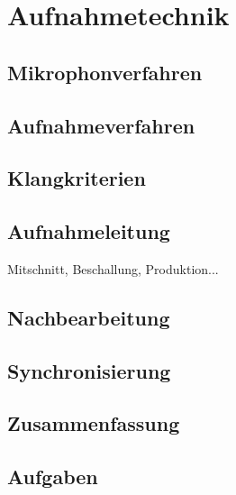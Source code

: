 \chapter{Aufnahmetechnik}
\section{Mikrophonverfahren}
\thispagestyle{empty}

\section{Aufnahmeverfahren}
\thispagestyle{empty}

\section{Klangkriterien}
\thispagestyle{empty}

\section{Aufnahmeleitung}
\thispagestyle{empty}
Mitschnitt, Beschallung, Produktion...

\section{Nachbearbeitung}
\thispagestyle{empty}

\section{Synchronisierung}
\thispagestyle{empty}

\section{Zusammenfassung}
\thispagestyle{empty}

\section{Aufgaben}
\newpage
\thispagestyle{empty}
